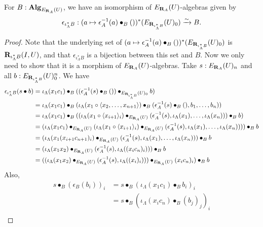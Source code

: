 \begin{lemma}
  For $ B : \mathbf{Alg}_{E_{\mathbf{R}_A}(U)} $, we have an isomorphism of $ E_{\mathbf{R}_A}(U) $-algebras given by
  \[ \epsilon_{\iota_\Lambda^* B} : (a \mapsto \epsilon_A^{-1}(a) \bullet_B ())^* (E_{\mathbf{R}_{\iota_\Lambda^* B}}(U)_0) \xrightarrow \sim B. \]
\end{lemma}
\begin{proof}
  Note that the underlying set of $ (a \mapsto \epsilon_A^{-1}(a) \bullet_B ())^* (E_{\mathbf{R}_{\iota_\Lambda^* B}}(U)_0) $ is $ \mathbf{R}_{\iota_\Lambda^* B}(I, U) $, and that $ \epsilon_{\iota_\Lambda^* B} $ is a bijection between this set and $ B $. Now we only need to show that it is a morphism of $ E_{\mathbf{R}_A}(U) $-algebras. Take $ s: E_{\mathbf{R}_A}(U)_n $ and all $ b : E_{\mathbf{R}_{\iota_\Lambda^* B}}(U)_0^n $. We have
  \begin{align*}
    \epsilon_{\iota_\Lambda^* B}(s \bullet b)
    &= \iota_\Lambda(x_1 c_1) \bullet_B ((\epsilon_A^{-1}(s) \bullet_B ()) \bullet_{E_{\mathbf{R}_{\iota_\Lambda^* B}}(U)_0} b)\\
    &= \iota_\Lambda(x_1 c_1) \bullet_B (\iota_\Lambda(x_1 \circ \langle x_2, \dots, x_{n + 1} \rangle) \bullet_B (\epsilon_A^{-1}(s) \bullet_B (), b_1, \dots, b_n))\\
    &= \iota_\Lambda(x_1 c_1) \bullet_B ((\iota_\Lambda(x_1 \circ \langle x_{i + 1} \rangle_i) \bullet_{E_{\mathbf{R}_A}(U)} (\epsilon_A^{-1}(s), \iota_\Lambda(x_1), \dots, \iota_\Lambda(x_n))) \bullet_B b)\\
    &= (\iota_\Lambda(x_1 c_1) \bullet_{E_{\mathbf{R}_A}(U)} (\iota_\Lambda(x_1 \circ \langle x_{i + 1} \rangle_i) \bullet_{E_{\mathbf{R}_A}(U)} (\epsilon_A^{-1}(s), \iota_\Lambda(x_1), \dots, \iota_\Lambda(x_n)))) \bullet_B b\\
    &= (\iota_\Lambda(x_1 (x_{i + 1} c_{n + 1})_i) \bullet_{E_{\mathbf{R}_A}(U)} (\epsilon_A^{-1}(s), \iota_\Lambda(x_1), \dots, \iota_\Lambda(x_n))) \bullet_B b\\
    &= (\iota_\Lambda(x_1 x_2) \bullet_{E_{\mathbf{R}_A}(U)} (\epsilon_A^{-1}(s), \iota_\Lambda((x_i c_n)_i))) \bullet_B b\\
    &= ((\iota_\Lambda(x_1 x_2) \bullet_{E_{\mathbf{R}_A}(U)} (\epsilon_A^{-1}(s), \iota_\Lambda((x_i)_i))) \bullet_{E_{\mathbf{R}_A}(U)} (x_i c_n)_i) \bullet_B b\\
  \end{align*}
  Also,
  \begin{align*}
    s \bullet_B (\epsilon_B(b_i))_i
    &= s \bullet_B (\iota_\Lambda(x_1 c_1) \bullet_B b_i)_i\\
    &= s \bullet_B (\iota_\Lambda(x_i c_n) \bullet_B (b_j)_j)_i\\

\end{align*}
\end{proof}

